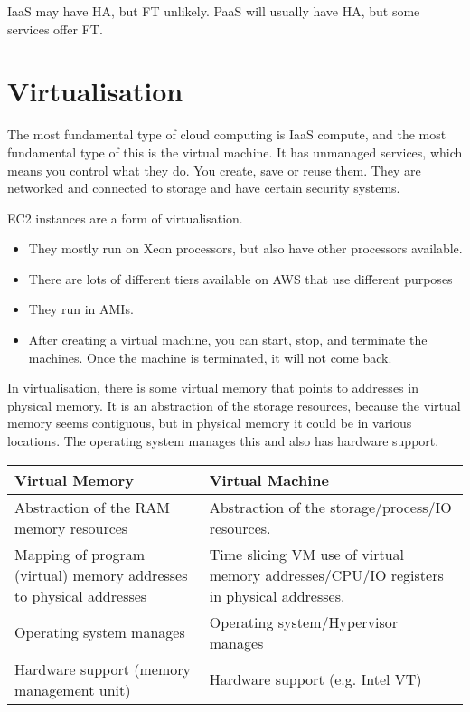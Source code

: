 \documentclass[11pt,a4paper,titlepage,dvipsnames,cmyk]{scrartcl}
\begin{document}
IaaS may have HA, but FT unlikely. PaaS will usually have HA, but some services offer FT.

\section{Virtualisation}
The most fundamental type of cloud computing is IaaS compute, and the most fundamental type of this is the virtual machine. It has unmanaged services, which means you control what they do. You create, save or reuse them. They are networked and connected to storage and have certain security systems.

EC2 instances are a form of virtualisation.
\begin{itemize}
    \item They mostly run on Xeon processors, but also have other processors available.
    \item There are lots of different tiers available on AWS that use different purposes
    \item They run in AMIs.
    \item After creating a virtual machine, you can start, stop, and terminate the machines. Once the machine is terminated, it will not come back.
\end{itemize}

In virtualisation, there is some virtual memory that points to addresses in physical memory. It is an abstraction of the storage resources, because the virtual memory seems contiguous, but in physical memory it could be in various locations. The operating system manages this and also has hardware support.

\begin{center}
    \begin{tabularx}{\textwidth}{X|X}
        \textbf{Virtual Memory} & \textbf{Virtual Machine} \\ \midrule
        Abstraction of the RAM memory resources & Abstraction of the storage/process/IO resources. \\
        Mapping of program (virtual) memory addresses to physical addresses & Time slicing VM use of virtual memory addresses/CPU/IO registers in physical addresses. \\
        Operating system manages & Operating system/Hypervisor manages \\
        Hardware support (memory management unit) & Hardware support (e.g. Intel VT)
    \end{tabularx}
\end{center}
\end{document}
